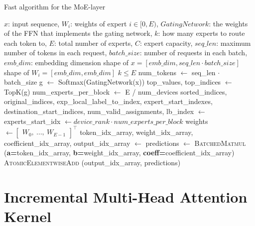 \begin{algorithm}[H]
  \caption{Fast algorithm for the MoE-layer}
  \label{alg:parallel-moe}
  \small
  \begin{algorithmic}[1]
    \Ensure $x$: input sequence, $W_{i}$: weights of expert $i \in [0, E)$, $GatingNetwork$: the weights of the FFN that implements the gating network, $k$: how many experts to route each token to, $E$: total number of experts, $C$: expert capacity, $seq\_len$: maximum number of tokens in each request, $batch\_size$: number of requests in each batch, $emb\_dim$: embedding dimension
    \Require shape of $x = [emb\_dim, seq\_len \cdot batch\_size]$
    \Require shape of $W_{i} = [emb\_dim, emb\_dim]$
    \Require $k \leq E$
    \State num\_tokens $\leftarrow$ seq\_len $\cdot$ batch\_size
    \State g $\leftarrow$ Softmax(GatingNetwork(x))
    \State top\_values, top\_indices $\leftarrow$ TopK(g)
    \State num\_experts\_per\_block $\leftarrow$ E / num\_devices
    \State sorted\_indices, original\_indices, exp\_local\_label\_to\_index, expert\_start\_indexes, destination\_start\_indices, num\_valid\_assignments, lb\_index $\leftarrow$ 
    \State experts\_start\_idx $\leftarrow device\_rank \cdot num\_experts\_per\_block$
    \State weights $\leftarrow \begin{bmatrix} W_0, \ \dots, \ W_{E-1} \end{bmatrix}^\top$
    \State token\_idx\_array, weight\_idx\_array, coefficient\_idx\_array, output\_idx\_array $\leftarrow$ 
    \State predictions $\leftarrow$ \textsc{BatchedMatmul} (\textbf{a=}token\_idx\_array, \textbf{b=}weight\_idx\_array, \textbf{coeff=}coefficient\_idx\_array)
    \State \textsc{AtomicElementwiseAdd} (output\_idx\_array, predictions)

  \end{algorithmic}
\end{algorithm}


\section{Incremental Multi-Head Attention Kernel}\label{section-simple-mha-kernel}

